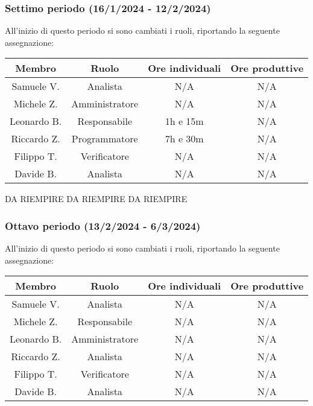 \subsubsection{Settimo periodo (16/1/2024 - 12/2/2024)}
All'inizio di questo periodo si sono cambiati i ruoli, riportando la seguente assegnazione:

\vspace{10 mm}
\begin{tabular}{|c|c|c|c|}
\hline
\textbf{Membro} & \textbf{Ruolo} & \textbf{Ore individuali} & \textbf{Ore produttive} \\
\hline
Samuele V. & Analista & N/A & N/A \\
\hline
Michele Z. & Amministratore & N/A & N/A \\
\hline
Leonardo B. & Responsabile & 1h e 15m & N/A \\
\hline
Riccardo Z. & Programmatore & 7h e 30m & N/A \\
\hline
Filippo T. & Verificatore & N/A & N/A \\
\hline
Davide B. & Analista & N/A & N/A \\
\hline
\end{tabular}
\vspace{10 mm}

DA RIEMPIRE
DA RIEMPIRE
DA RIEMPIRE

\subsubsection{Ottavo periodo (13/2/2024 - 6/3/2024)}
All'inizio di questo periodo si sono cambiati i ruoli, riportando la seguente assegnazione:

\vspace{10 mm}
\begin{tabular}{|c|c|c|c|}
\hline
\textbf{Membro} & \textbf{Ruolo} & \textbf{Ore individuali} & \textbf{Ore produttive} \\
\hline
Samuele V. & Analista & N/A & N/A \\
\hline
Michele Z. & Responsabile & N/A & N/A \\
\hline
Leonardo B. & Amministratore & N/A & N/A \\
\hline
Riccardo Z. & Analista & N/A & N/A \\
\hline
Filippo T. & Verificatore & N/A & N/A \\
\hline
Davide B. & Analista & N/A & N/A \\
\hline
\end{tabular}
\vspace{10 mm}

